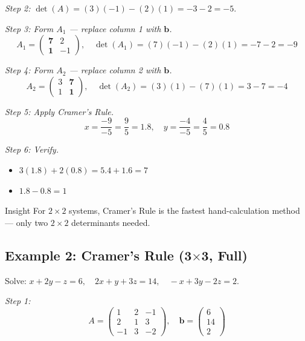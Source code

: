 \documentclass[12pt,a4paper]{article}
\begin{document}
\textit{Step 2:} \(\det(A) = (3)(-1) - (2)(1) = -3 - 2 = -5\).

\textit{Step 3: Form \(A_1\) --- replace column 1 with \(\mathbf{b}\).}
\[
A_1 = \begin{pmatrix} \mathbf{7} & 2 \\ \mathbf{1} & -1 \end{pmatrix}, \quad \det(A_1) = (7)(-1)-(2)(1) = -7-2 = -9
\]

\textit{Step 4: Form \(A_2\) --- replace column 2 with \(\mathbf{b}\).}
\[
A_2 = \begin{pmatrix} 3 & \mathbf{7} \\ 1 & \mathbf{1} \end{pmatrix}, \quad \det(A_2) = (3)(1)-(7)(1) = 3-7 = -4
\]

\textit{Step 5: Apply Cramer's Rule.}
\[
x = \frac{-9}{-5} = \frac{9}{5} = 1.8, \quad y = \frac{-4}{-5} = \frac{4}{5} = 0.8
\]

\textit{Step 6: Verify.}
\begin{itemize}[noitemsep]
  \item \(3(1.8)+2(0.8) = 5.4+1.6 = 7\) \checkmark
  \item \(1.8 - 0.8 = 1\) \checkmark
\end{itemize}

\begin{learnbox}{Insight}
For \(2\times2\) systems, Cramer's Rule is the fastest hand-calculation method --- only two \(2\times2\) determinants needed.
\end{learnbox}

\subsection*{Example 2: Cramer's Rule (3$\times$3, Full)}

Solve: \(x + 2y - z = 6,\quad 2x + y + 3z = 14,\quad -x + 3y - 2z = 2\).

\textit{Step 1:}
\[
A = \begin{pmatrix}1&2&-1\\2&1&3\\-1&3&-2\end{pmatrix}, \quad \mathbf{b} = \begin{pmatrix}6\\14\\2\end{pmatrix}
\]
\end{document}
